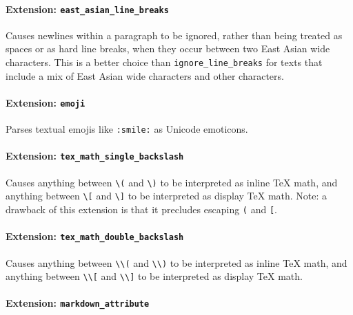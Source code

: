 \documentclass[
]{article}
\begin{document}
\paragraph{\texorpdfstring{Extension:
\texttt{east\_asian\_line\_breaks}}{Extension: east\_asian\_line\_breaks}}\label{extension-east_asian_line_breaks}

Causes newlines within a paragraph to be ignored, rather than being
treated as spaces or as hard line breaks, when they occur between two
East Asian wide characters. This is a better choice than
\texttt{ignore\_line\_breaks} for texts that include a mix of East Asian
wide characters and other characters.

\paragraph{\texorpdfstring{Extension:
\texttt{emoji}}{Extension: emoji}}\label{extension-emoji}

Parses textual emojis like \texttt{:smile:} as Unicode emoticons.

\paragraph{\texorpdfstring{Extension:
\texttt{tex\_math\_single\_backslash}}{Extension: tex\_math\_single\_backslash}}\label{extension-tex_math_single_backslash}

Causes anything between \texttt{\textbackslash{}(} and
\texttt{\textbackslash{})} to be interpreted as inline TeX math, and
anything between \texttt{\textbackslash{}{[}} and
\texttt{\textbackslash{}{]}} to be interpreted as display TeX math.
Note: a drawback of this extension is that it precludes escaping
\texttt{(} and \texttt{{[}}.

\paragraph{\texorpdfstring{Extension:
\texttt{tex\_math\_double\_backslash}}{Extension: tex\_math\_double\_backslash}}\label{extension-tex_math_double_backslash}

Causes anything between \texttt{\textbackslash{}\textbackslash{}(} and
\texttt{\textbackslash{}\textbackslash{})} to be interpreted as inline
TeX math, and anything between
\texttt{\textbackslash{}\textbackslash{}{[}} and
\texttt{\textbackslash{}\textbackslash{}{]}} to be interpreted as
display TeX math.

\paragraph{\texorpdfstring{Extension:
\texttt{markdown\_attribute}}{Extension: markdown\_attribute}}\label{extension-markdown_attribute}
\end{document}
